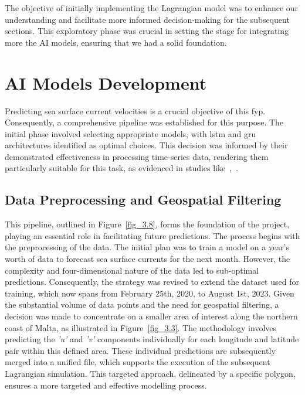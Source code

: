 The objective of initially implementing the Lagrangian model was to enhance our understanding and facilitate more informed decision-making for the subsequent sections. This exploratory phase was crucial in setting the stage for integrating more the AI models, ensuring that we had a solid foundation.

\section{AI Models Development}
\label{sec:3.3}

Predicting sea surface current velocities is a crucial objective of this \acrshort{fyp}. Consequently, a comprehensive pipeline was established for this purpose. The initial phase involved selecting appropriate models, with \acrshort{lstm} and \acrshort{gru} architectures identified as optimal choices. This decision was informed by their demonstrated effectiveness in processing time-series data, rendering them particularly suitable for this task, as evidenced in studies like~\cite{42},~\cite{43}.

\subsection{Data Preprocessing and Geospatial Filtering}
\label{subsec:3.3.1}

This pipeline, outlined in Figure~\ref{fig_3.8}, forms the foundation of the project, playing an essential role in facilitating future predictions. The process begins with the preprocessing of the data. The initial plan was to train a model on a year's worth of data to forecast sea surface currents for the next month. However, the complexity and four-dimensional nature of the data led to sub-optimal predictions. Consequently, the strategy was revised to extend the dataset used for training, which now spans from February 25th, 2020, to August 1st, 2023. Given the substantial volume of data points and the need for geospatial filtering, a decision was made to concentrate on a smaller area of interest along the northern coast of Malta, as illustrated in Figure~\ref{fig_3.3}. The methodology involves predicting the \textit{'u'} and \textit{'v'} components individually for each longitude and latitude pair within this defined area. These individual predictions are subsequently merged into a unified file, which supports the execution of the subsequent Lagrangian simulation. This targeted approach, delineated by a specific polygon, ensures a more targeted and effective modelling process.

